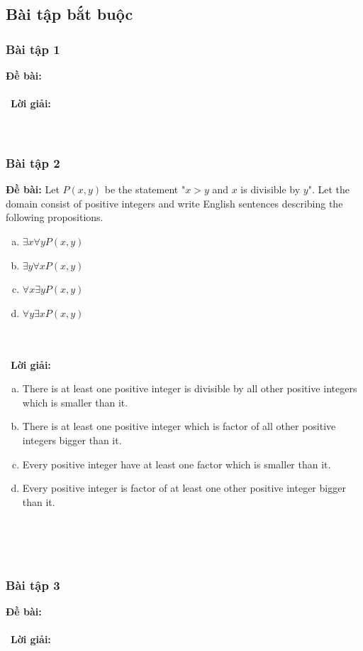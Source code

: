 \documentclass[a4paper]{article}
\begin{document}
\subsection{Bài tập bắt buộc}
\subsubsection{Bài tập 1}
\textbf{Đề bài:} 
\\\ \\\
\textbf{Lời giải:} \\\ \\\
\clearpage
\subsubsection{Bài tập 2}
\textbf{Đề bài:} Let $P(x,y)$ be the statement "$x>y$ and $x$ is divisible by $y$". Let the domain consist of positive integers and write English sentences describing the following propositions.
\begin{enumerate} [a)]
\item $\exists x \forall y P(x,y)$
\item $\exists y \forall x P(x,y)$
\item $\forall x \exists y P(x,y)$
\item $\forall y \exists x P(x,y)$
\end{enumerate}
\\\ \\\
\textbf{Lời giải:} \begin{enumerate} [a)]
\item There is at least one positive integer is divisible by all other positive integers which is smaller than it.
\item There is at least one positive integer which is factor of all other positive integers bigger than it. 
\item Every positive integer have at least one factor which is smaller than it.
\item Every positive integer is factor of at least one other positive integer bigger than it.
\end{enumerate} \\\ \\\
\clearpage
\subsubsection{Bài tập 3}
\textbf{Đề bài:} 
\\\ \\\
\textbf{Lời giải:} \\\ \\\
\clearpage
\end{document}
